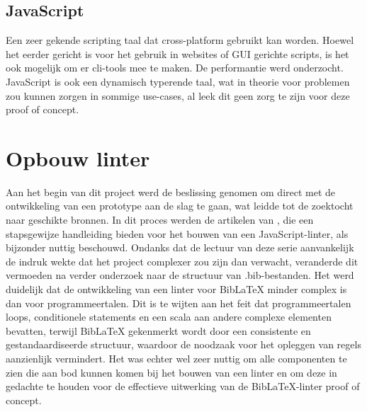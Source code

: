\subsection{JavaScript}
Een zeer gekende scripting taal dat cross-platform gebruikt kan worden. Hoewel het eerder gericht is voor het gebruik in websites of GUI gerichte scripts, is het ook mogelijk om er cli-tools mee te maken. De performantie werd onderzocht. JavaScript is ook een dynamisch typerende taal, wat in theorie voor problemen zou kunnen zorgen in sommige use-cases, al leek dit geen zorg te zijn voor deze proof of concept.\autocite{MDN2024}

\section{Opbouw linter}
Aan het begin van dit project werd de beslissing genomen om direct met de ontwikkeling van een prototype aan de slag te gaan, wat leidde tot de zoektocht naar geschikte bronnen. In dit proces werden de artikelen van \textcite{BorgesLate2021}, die een stapsgewijze handleiding bieden voor het bouwen van een JavaScript-linter, als bijzonder nuttig beschouwd. Ondanks dat de lectuur van deze serie aanvankelijk de indruk wekte dat het project complexer zou zijn dan verwacht, veranderde dit vermoeden na verder onderzoek naar de structuur van .bib-bestanden. Het werd duidelijk dat de ontwikkeling van een linter voor BibLaTeX minder complex is dan voor programmeertalen. Dit is te wijten aan het feit dat programmeertalen loops, conditionele statements en een scala aan andere complexe elementen bevatten, terwijl BibLaTeX gekenmerkt wordt door een consistente en gestandaardiseerde structuur, waardoor de noodzaak voor het opleggen van regels aanzienlijk vermindert. Het was echter wel zeer nuttig om alle componenten te zien die aan bod kunnen komen bij het bouwen van een linter en om deze in gedachte te houden voor de effectieve uitwerking van de BibLaTeX-linter proof of concept.

